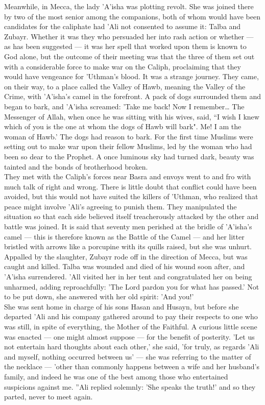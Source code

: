 \documentclass[10pt, twoside]{book}
\begin{document}
Meanwhile, in Mecca, the lady 'A'isha was plotting revolt. She was joined there by two of the most senior among the companions, both of whom would have been candidates for the caliphate had 'Ali not consented to assume it: Talba and Zubayr. Whether it was they who persuaded her into rash action or whether --- as has been suggested --- it was her spell that worked upon them is known to God alone, but the outcome of their meeting was that the three of them set out with a considerable force to make war on the Caliph, proclaiming that they would have vengeance for 'Uthman's blood. It was a strange journey. They came, on their way, to a place called the Valley of Hawb, meaning the Valley of the Crime, with 'A'isha's camel in the forefront. A pack of dogs surrounded them and began to bark, and 'A'isha screamed: 'Take me back! Now I remember\ldots{} The Messenger of Allah, when once he was sitting with his wives, said, ``I wish I knew which of you is the one at whom the dogs of Hawb will bark". Me! I am the woman of Hawb.' The dogs had reason to bark. For the first time Muslims were setting out to make war upon their fellow Muslims, led by the woman who had been so dear to the Prophet. A once luminous sky had turned dark, beauty was tainted and the bonds of brotherhood broken. \\

They met with the Caliph's forces near Basra and envoys went to and fro with much talk of right and wrong. There is little doubt that conflict could have been avoided, but this would not have suited the killers of 'Uthman, who realized that peace might involve 'Ali's agreeing to punish them. They manipulated the situation so that each side believed itself treacherously attacked by the other and battle was joined. It is said that seventy men perished at the bridle of 'A'isha's camel --- this is therefore known as the Battle of the Camel --- and her litter bristled with arrows like a porcupine with its quills raised, but she was unhurt. Appalled by the slaughter, Zubayr rode off in the direction of Mecca, but was caught and killed. Talba was wounded and died of his wound soon after, and 'A'isha surrendered. 'All visited her in her tent and congratulated her on being unharmed, adding reproachfully: 'The Lord pardon you for what has passed.' Not to be put down, she answered with her old spirit: 'And you!' \\

She was sent home in charge of his sons Hasan and Husayn, but before she departed 'Ali and his company gathered around to pay their respects to one who was still, in spite of everything, the Mother of the Faithful. A curious little scene was enacted --- one might almost suppose --- for the benefit of posterity. 'Let us not entertain hard thoughts about each other,' she said, 'for truly, as regards 'Ali and myself, nothing occurred between us' --- she was referring to the matter of the necklace --- 'other than commonly happens between a wife and her husband's family, and indeed he was one of the best among those who entertained suspicions against me. ''Ali replied solemnly: 'She speaks the truth!' and so they parted, never to meet again. \\
\end{document}
